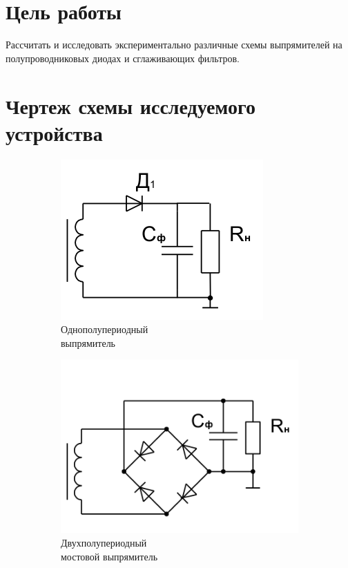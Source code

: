 





\section{Цель работы}

Рассчитать и исследовать экспериментально различные схемы выпрямителей на полупроводниковых диодах и сглаживающих фильтров.

\section{Чертеж схемы исследуемого устройства}
\begin{figure}[h]
	\centering
	\vspace{-0.5cm}
	\begin{subfigure}[b]{0.35\textwidth}
		\includegraphics[scale=0.75]{img/diod.png}
		\caption{Однополупериодный \\выпрямитель}\label{figure:2.1:a}
	\end{subfigure}
	\begin{subfigure}[b]{0.35\textwidth}
		\includegraphics[scale=0.40]{img/4diods.png}
		\caption{Двухполупериодный \\мостовой выпрямитель}\label{figure:2.1:b}
	\end{subfigure}
	\caption{}
\end{figure}

